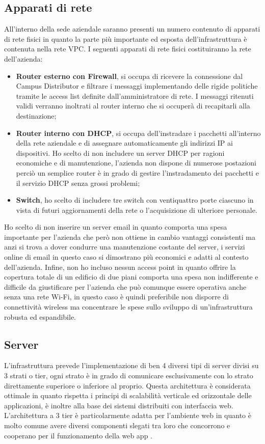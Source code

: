 \subsection{Apparati di rete}
All'interno della sede aziendale saranno presenti un numero contenuto di apparati di rete fisici in quanto la parte più importante ed esposta dell'infrastruttura è contenuta nella rete VPC. I seguenti apparati di rete fisici costituiranno la rete dell'azienda: 
\begin{itemize}
    \item \textbf{Router esterno con Firewall}, si occupa di ricevere la connessione dal Campus Distributor e filtrare i messaggi implementando delle rigide politiche tramite le access list definite dall'amministratore di rete. I messaggi ritenuti validi verranno inoltrati al router interno che si occuperà di recapitarli alla destinazione;
    \item \textbf{Router interno con DHCP}, si occupa dell'instradare i pacchetti all'interno della rete aziendale e di assegnare automaticamente gli indirizzi IP ai dispositivi. Ho scelto di non includere un server DHCP per ragioni economiche e di manutenzione, l'azienda non dispone di numerose postazioni perciò un semplice router è in grado di gestire l'instradamento dei pacchetti e il servizio DHCP senza grossi problemi;
    \item \textbf{Switch}, ho scelto di includere tre switch con ventiquattro porte ciascuno in vista di futuri aggiornamenti della rete o l'acquisizione di ulteriore personale. 
\end{itemize}
Ho scelto di non inserire un server email in quanto comporta una spesa importante per l'azienda che però non ottiene in cambio vantaggi consistenti ma anzi si trova a dover condurre una manutenzione costante del server, i servizi online di email in questo caso si dimostrano più economici e adatti al contesto dell'azienda. Infine, non ho incluso nessun access point in quanto offrire la copertura totale di un edificio di due piani comporta una spesa non indifferente e difficile da giustificare per l'azienda che può comunque essere operativa anche senza una rete Wi-Fi, in questo caso è quindi preferibile non disporre di connettività wireless ma concentrare le spese sullo sviluppo di un'infrastruttura robusta ed espandibile. 
\subsection{Server}
L'infrastruttura prevede l'implementazione di ben 4 diversi tipi di server divisi su 3 strati o tier, ogni strato è in grado di comunicare esclusivamente con lo strato direttamente superiore o inferiore al proprio. Questa architettura è considerata ottimale in quanto rispetta i principi di scalabilità verticale ed orizzontale delle applicazioni, è inoltre alla base dei sistemi distribuiti con interfaccia web. L'architettura a 3 tier è particolarmente adatta per l'ambiente web in quanto è molto comune avere diversi componenti slegati tra loro che concorrono e cooperano per il funzionamento della web app \cite{3Tier}. 
\medskip

